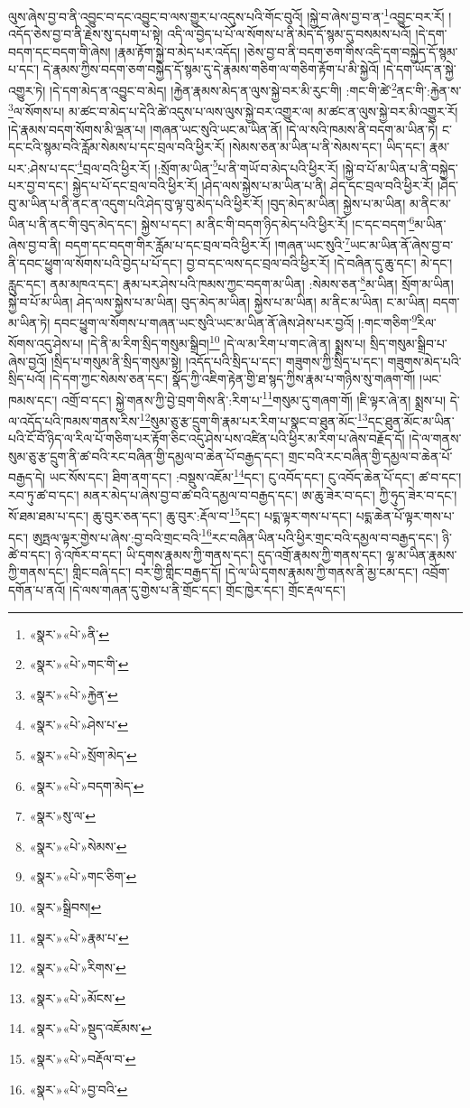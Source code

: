 ལུས་ཞེས་བྱ་བ་ནི་འབྱུང་བ་དང་འབྱུང་བ་ལས་གྱུར་པ་འདུས་པའི་གོང་བུའོ། །སྐྱེ་བ་ཞེས་བྱ་བ་ན་\footnote{«སྣར་»«པེ་»ནི་}འབྱུང་བར་རོ། །འདོད་ཅེས་བྱ་བ་ནི་རྗེས་སུ་དཔག་པ་སྟེ། འདི་ལ་བྱེད་པ་པོ་ལ་སོགས་པ་ནི་མེད་དོ་སྙམ་དུ་བསམས་པའོ། །དེ་དག་བདག་དང་བདག་གི་ཞེས། །རྣམ་རྟོག་སྐྱེ་བ་མེད་པར་འདོད། །ཅེས་བྱ་བ་ནི་བདག་ཅག་གིས་འདི་དག་བསྐྱེད་དོ་སྙམ་པ་དང་། དེ་རྣམས་ཀྱིས་བདག་ཅག་བསྐྱེད་དོ་སྙམ་དུ་དེ་རྣམས་གཅིག་ལ་གཅིག་རྟོག་པ་མི་སྐྱེའོ། །དེ་དག་ཡོད་ན་སྐྱེ་འགྱུར་ཏེ། །དེ་དག་མེད་ན་འབྱུང་བ་མེད། །རྐྱེན་རྣམས་མེད་ན་ལུས་སྐྱེ་བར་མི་རུང་གི། :གང་གི་ཚེ་\footnote{«སྣར་»«པེ་»གང་གི་}ནང་གི་:རྐྱེན་ས་\footnote{«སྣར་»«པེ་»རྐྱེན་}ལ་སོགས་པ། མ་ཚང་བ་མེད་པ་དེའི་ཚེ་འདུས་པ་ལས་ལུས་སྐྱེ་བར་འགྱུར་ལ། མ་ཚང་ན་ལུས་སྐྱེ་བར་མི་འགྱུར་རོ། །དེ་རྣམས་བདག་སོགས་མི་ལྡན་པ། །གཞན་ཡང་སུའི་ཡང་མ་ཡིན་ནོ། །དེ་ལ་སའི་ཁམས་ནི་བདག་མ་ཡིན་ཏེ། ང་དང་ངའི་སྙམ་བའི་རློམ་སེམས་པ་དང་བྲལ་བའི་ཕྱིར་རོ། །སེམས་ཅན་མ་ཡིན་པ་ནི་སེམས་དང་། ཡིད་དང་། རྣམ་པར་:ཤེས་པ་དང་\footnote{«སྣར་»«པེ་»ཤེས་པ་}བྲལ་བའི་ཕྱིར་རོ། །:སྲོག་མ་ཡིན་\footnote{«སྣར་»«པེ་»སྲོག་མེད་}པ་ནི་གཡོ་བ་མེད་པའི་ཕྱིར་རོ། །སྐྱེ་བ་པོ་མ་ཡིན་པ་ནི་བསྐྱེད་པར་བྱ་བ་དང་། སྐྱེད་པ་པོ་དང་བྲལ་བའི་ཕྱིར་རོ། །ཤེད་ལས་སྐྱེས་པ་མ་ཡིན་པ་ནི། ཤེད་དང་བྲལ་བའི་ཕྱིར་རོ། །ཤེད་བུ་མ་ཡིན་པ་ནི་ནང་ན་འདུག་པའི་ཤེད་བུ་ལྟ་བུ་མེད་པའི་ཕྱིར་རོ། །བུད་མེད་མ་ཡིན། སྐྱེས་པ་མ་ཡིན། མ་ནིང་མ་ཡིན་པ་ནི་ནང་གི་བུད་མེད་དང་། སྐྱེས་པ་དང་། མ་ནིང་གི་བདག་ཉིད་མེད་པའི་ཕྱིར་རོ། །ང་དང་བདག་\footnote{«སྣར་»«པེ་»བདག་མེད་}མ་ཡིན་ཞེས་བྱ་བ་ནི། བདག་དང་བདག་གིར་རློམ་པ་དང་བྲལ་བའི་ཕྱིར་རོ། །གཞན་ཡང་སུའི་\footnote{«སྣར་»སུ་ལ་}ཡང་མ་ཡིན་ནོ་ཞེས་བྱ་བ་ནི་དབང་ཕྱུག་ལ་སོགས་པའི་བྱེད་པ་པོ་དང་། བྱ་བ་དང་ལས་དང་བྲལ་བའི་ཕྱིར་རོ། །དེ་བཞིན་དུ་ཆུ་དང་། མེ་དང་། རླུང་དང་། ནམ་མཁའ་དང་། རྣམ་པར་ཤེས་པའི་ཁམས་ཀྱང་བདག་མ་ཡིན། :སེམས་ཅན་\footnote{«སྣར་»«པེ་»སེམས་}མ་ཡིན། སྲོག་མ་ཡིན། སྐྱེ་བ་པོ་མ་ཡིན། ཤེད་ལས་སྐྱེས་པ་མ་ཡིན། བུད་མེད་མ་ཡིན། སྐྱེས་པ་མ་ཡིན། མ་ནིང་མ་ཡིན། ང་མ་ཡིན། བདག་མ་ཡིན་ཏེ། དབང་ཕྱུག་ལ་སོགས་པ་གཞན་ཡང་སུའི་ཡང་མ་ཡིན་ནོ་ཞེས་ཤེས་པར་བྱའོ། །:གང་གཅིག་\footnote{«སྣར་»«པེ་»གང་ཅིག་}རིལ་སོགས་འདུ་ཤེས་པ། །དེ་ནི་མ་རིག་སྲིད་གསུམ་སྒྲིབ།\footnote{«སྣར་»སྒྲིབས།} །དེ་ལ་མ་རིག་པ་གང་ཞེ་ན། སྨྲས་པ། སྲིད་གསུམ་སྒྲིབ་པ་ཞེས་བྱའོ། །སྲིད་པ་གསུམ་ནི་སྲིད་གསུམ་སྟེ། །འདོད་པའི་སྲིད་པ་དང་། གཟུགས་ཀྱི་སྲིད་པ་དང་། གཟུགས་མེད་པའི་སྲིད་པའོ། །དེ་དག་ཀྱང་སེམས་ཅན་དང་། སྣོད་ཀྱི་འཇིག་རྟེན་གྱི་ཐ་སྙད་ཀྱིས་རྣམ་པ་གཉིས་སུ་གཞག་གོ། །ཡང་ཁམས་དང་། འགྲོ་བ་དང་། སྐྱེ་གནས་ཀྱི་བྱེ་བྲག་གིས་ནི་:རིག་པ་\footnote{«སྣར་»«པེ་»རྣམ་པ་}གསུམ་དུ་གཞག་གོ། །ཇི་ལྟར་ཞེ་ན། སྨྲས་པ། དེ་ལ་འདོད་པའི་ཁམས་གནས་རིས་\footnote{«སྣར་»«པེ་»རིགས་}སུམ་ཅུ་རྩ་དྲུག་གི་རྣམ་པར་རིག་པ་སྣང་བ་ཐུན་མོང་\footnote{«སྣར་»«པེ་»མོངས་}དང་ཐུན་མོང་མ་ཡིན་པའི་ངོ་བོ་ཉིད་ལ་རིལ་པོ་གཅིག་པར་རྟོག་ཅིང་འདུ་ཤེས་པས་འཛིན་པའི་ཕྱིར་མ་རིག་པ་ཞེས་བརྗོད་དོ། །དེ་ལ་གནས་སུམ་ཅུ་རྩ་དྲུག་ནི་ཚ་བའི་རང་བཞིན་གྱི་དམྱལ་བ་ཆེན་པོ་བརྒྱད་དང་། གྲང་བའི་རང་བཞིན་གྱི་དམྱལ་བ་ཆེན་པོ་བརྒྱད་དེ། ཡང་སོས་དང་། ཐིག་ནག་དང་། :བསྡུས་འཇོམ་\footnote{«སྣར་»«པེ་»སྡུད་འཇོམས་}དང་། ངུ་འབོད་དང་། ངུ་འབོད་ཆེན་པོ་དང་། ཚ་བ་དང་། རབ་ཏུ་ཚ་བ་དང་། མནར་མེད་པ་ཞེས་བྱ་བ་ཚ་བའི་དམྱལ་བ་བརྒྱད་དང་། ཨ་ཆུ་ཟེར་བ་དང་། ཀྱི་ཧུད་ཟེར་བ་དང་། སོ་ཐམ་ཐམ་པ་དང་། ཆུ་བུར་ཅན་དང་། ཆུ་བུར་:རྡོལ་བ་\footnote{«སྣར་»«པེ་»བརྡོལ་བ་}དང་། པདྨ་ལྟར་གས་པ་དང་། པདྨ་ཆེན་པོ་ལྟར་གས་པ་དང་། ཨུཏྤལ་ལྟར་གྱེས་པ་ཞེས་:བྱ་བའི་གྲང་བའི་\footnote{«སྣར་»«པེ་»བྱ་བའི་}རང་བཞིན་ཡིན་པའི་ཕྱིར་གྲང་བའི་དམྱལ་བ་བརྒྱད་དང་། ཉི་ཚེ་བ་དང་། ཉེ་འཁོར་བ་དང་། ཡི་དྭགས་རྣམས་ཀྱི་གནས་དང་། དུད་འགྲོ་རྣམས་ཀྱི་གནས་དང་། ལྷ་མ་ཡིན་རྣམས་ཀྱི་གནས་དང་། གླིང་བཞི་དང་། བར་གྱི་གླིང་བརྒྱད་དོ། །དེ་ལ་ཡི་དྭགས་རྣམས་ཀྱི་གནས་ནི་མྱ་ངམ་དང་། འབྲོག་དགོན་པ་ནའོ། །དེ་ལས་གཞན་དུ་གྱེས་པ་ནི་གྲོང་དང་། གྲོང་ཁྱེར་དང་། གྲོང་རྡལ་དང་། 
